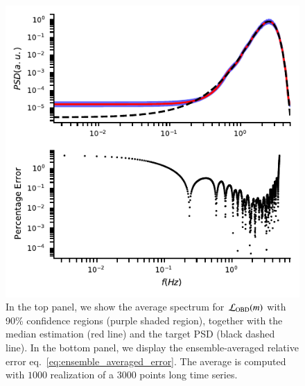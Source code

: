 \documentclass{aa}
\begin{document}
\begin{figure}[t]
	\centering
	\includegraphics[width = \linewidth]{Images/optimisers_comparison/normal/OBD_spectrum_estim.pdf}
	\caption{In the top panel, we show the average spectrum for $\mathcal{L}_{\rm OBD}(m)$ with 90\% confidence regions (purple shaded region), together with the median estimation (red line) and the target PSD (black dashed line). In the bottom panel, we display the ensemble-averaged relative error eq.~\eqref{eq:ensemble_averaged_error}. The average is computed with $1000$ realization of a $3000$ points long time series.}
	\label{fig:OBDmean}
\end{figure}
\end{document}
